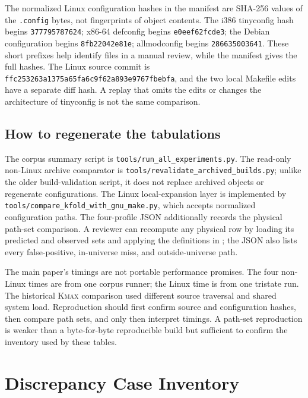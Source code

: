 \documentclass[acmsmall,screen,review]{acmart}
\begin{document}
The normalized Linux configuration hashes in the manifest are SHA-256 values of the \texttt{.config} bytes, not fingerprints of object contents. The i386 tinyconfig hash begins \texttt{377795787624}; x86-64 defconfig begins \texttt{e0eef62fcde3}; the Debian configuration begins \texttt{8fb22042e81e}; allmodconfig begins \texttt{286635003641}. These short prefixes help identify files in a manual review, while the manifest gives the full hashes. The Linux source commit is \texttt{ffc253263a1375a65fa6c9f62a893e9767fbebfa}, and the two local Makefile edits have a separate diff hash. A replay that omits the edits or changes the architecture of tinyconfig is not the same comparison.

\subsection{How to regenerate the tabulations}
The corpus summary script is \texttt{tools/run\_all\_experiments.py}. The read-only non-Linux archive comparator is \texttt{tools/revalidate\_archived\_builds.py}; unlike the older build-validation script, it does not replace archived objects or regenerate configurations. The Linux local-expansion layer is implemented by \texttt{tools/compare\_kfold\_with\_gnu\_make.py}, which accepts normalized configuration paths. The four-profile JSON additionally records the physical path-set comparison. A reviewer can recompute any physical row by loading its predicted and observed sets and applying the definitions in ; the JSON also lists every false-positive, in-universe miss, and outside-universe path.

The main paper's timings are not portable performance promises. The four non-Linux times are from one corpus runner; the Linux time is from one tristate run. The historical \textsc{Kmax} comparison used different source traversal and shared system load. Reproduction should first confirm source and configuration hashes, then compare path sets, and only then interpret timings. A path-set reproduction is weaker than a byte-for-byte reproducible build but sufficient to confirm the inventory used by these tables.

\section{Discrepancy Case Inventory}
\label{app:cases}
\end{document}
